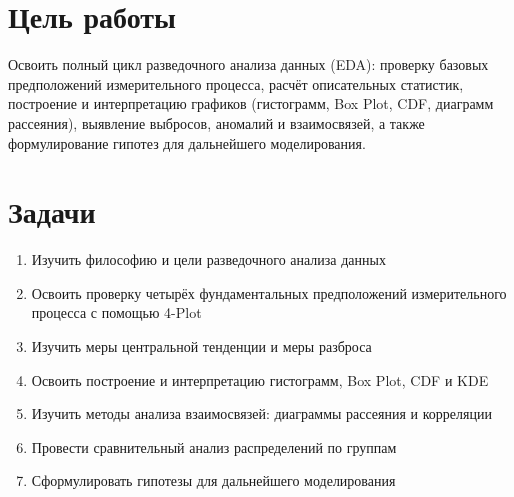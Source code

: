\pagestyle{empty}
\section*{Цель работы}

Освоить полный цикл разведочного анализа данных (EDA): проверку базовых предположений измерительного процесса, расчёт описательных статистик, построение и интерпретацию графиков (гистограмм, Box Plot, CDF, диаграмм рассеяния), выявление выбросов, аномалий и взаимосвязей, а также формулирование гипотез для дальнейшего моделирования.

\section*{Задачи}

\begin{enumerate}
    \item Изучить философию и цели разведочного анализа данных
\item Освоить проверку четырёх фундаментальных предположений измерительного процесса с помощью 4-Plot
\item Изучить меры центральной тенденции и меры разброса
\item Освоить построение и интерпретацию гистограмм, Box Plot, CDF и KDE
\item Изучить методы анализа взаимосвязей: диаграммы рассеяния и корреляции
\item Провести сравнительный анализ распределений по группам
\item Сформулировать гипотезы для дальнейшего моделирования 
\end{enumerate}